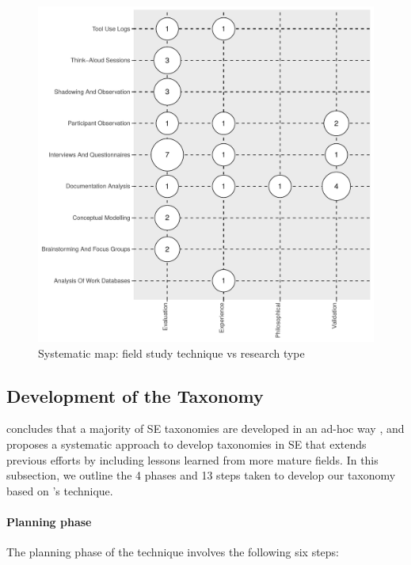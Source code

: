 \begin{figure}
  \centering
  \includegraphics[width=.55\linewidth]{sms}
  \caption[A systematic map of API documentation knowledge studies]{Systematic map: field study technique vs research type}
  \label{esem2019:fig:sms}
\end{figure}

\subsection{Development of the Taxonomy}
\label{esem2019:sec:method:taxonomy-development}

\citeauthor{Usman:2017hn} concludes that a majority of SE taxonomies are developed in an ad-hoc way \citep{Usman:2017hn}, and proposes a systematic approach to develop taxonomies in SE that extends previous efforts by including lessons learned from more mature fields. In this subsection, we outline the 4 phases and 13 steps taken to develop our taxonomy based on \citeauthor{Usman:2017hn}'s technique.

\paragraph{Planning phase} The planning phase of the technique involves the following six steps:

